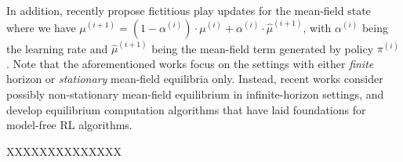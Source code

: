 In addition,   \cite{hadikhanloo2019finite,elie2019approximate} recently propose   fictitious play updates for the mean-field state where we have $\mu^{(i+1)} = (1-\alpha^{(i)}) \cdot \mu^{(i)} + \alpha^{(i)}  \cdot \hat  \mu^{(i+1)} $, with $ \alpha^{(i)}$
 being the learning rate and $\hat  \mu^{(i+1)}$ being the mean-field term generated by policy $\pi^{(i)}$. Note that the aforementioned works focus on  the settings with either \emph{finite} horizon \cite{hadikhanloo2019finite,elie2019approximate} or \emph{stationary} mean-field equilibria  \cite{guo2019learning,subramanian2019reinforcement,fu2019actor}  only. Instead, recent works 
 \cite{anahtarci2019value,zaman2019approx}  consider possibly non-stationary mean-field equilibrium in infinite-horizon settings, and develop equilibrium computation algorithms that have laid  foundations for model-free RL algorithms. 
 
 




 



\iffalse
 
\vspace{10pt}
XXXXXXXXXXXXXX

\noindent{}

